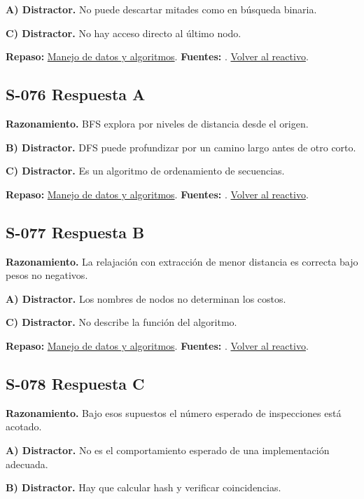 \textbf{A) Distractor. }No puede descartar mitades como en búsqueda binaria.

\textbf{C) Distractor. }No hay acceso directo al último nodo.

\textbf{Repaso:} \hyperref[sec:s3]{Manejo de datos y algoritmos}. \textbf{Fuentes:} \cite{algorithms,postgres,ai}. \hyperref[q:S-075]{Volver al reactivo}.\par\medskip

\subsection*{S-076 \quad Respuesta A}\label{s:S-076}
\textbf{Razonamiento.} BFS explora por niveles de distancia desde el origen.

\textbf{B) Distractor. }DFS puede profundizar por un camino largo antes de otro corto.

\textbf{C) Distractor. }Es un algoritmo de ordenamiento de secuencias.

\textbf{Repaso:} \hyperref[sec:s3]{Manejo de datos y algoritmos}. \textbf{Fuentes:} \cite{algorithms,postgres,ai}. \hyperref[q:S-076]{Volver al reactivo}.\par\medskip

\subsection*{S-077 \quad Respuesta B}\label{s:S-077}
\textbf{Razonamiento.} La relajación con extracción de menor distancia es correcta bajo pesos no negativos.

\textbf{A) Distractor. }Los nombres de nodos no determinan los costos.

\textbf{C) Distractor. }No describe la función del algoritmo.

\textbf{Repaso:} \hyperref[sec:s3]{Manejo de datos y algoritmos}. \textbf{Fuentes:} \cite{algorithms,postgres,ai}. \hyperref[q:S-077]{Volver al reactivo}.\par\medskip

\subsection*{S-078 \quad Respuesta C}\label{s:S-078}
\textbf{Razonamiento.} Bajo esos supuestos el número esperado de inspecciones está acotado.

\textbf{A) Distractor. }No es el comportamiento esperado de una implementación adecuada.

\textbf{B) Distractor. }Hay que calcular hash y verificar coincidencias.

